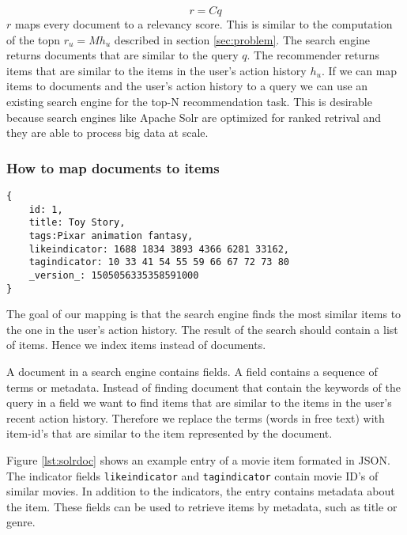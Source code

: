 \begin{equation}
  \label{eq:ser}
  r = C q
\end{equation}
$r$ maps every document to a relevancy score.
This is similar to the computation of the \gls{topn} $r_u = M h_u$  described in section \ref{sec:problem}. The search engine returns documents that are similar to the query $q$. The recommender returns items that are similar to the items in the user's action history $h_u$. If we can map items to documents and the user's action history to a query we can use an existing search engine for the top-N recommendation task. This is desirable because search engines like Apache Solr are optimized for ranked retrival and they are able to process big data at scale. 

\subsubsection{How to map documents to items}

\begin{lstlisting}[caption={Item metadata and similar items are stored in Solr.},label={lst:solrdoc}]
{
    id: 1,
    title: Toy Story,
    tags:Pixar animation fantasy,
    likeindicator: 1688 1834 3893 4366 6281 33162,
    tagindicator: 10 33 41 54 55 59 66 67 72 73 80
    _version_: 1505056335358591000
}
\end{lstlisting}

The goal of our mapping is that the search engine finds the most similar items to the one in the user's action history.
The result of the search should contain a list of items. Hence we index items instead of documents.

A document in a search engine contains fields. A field contains a sequence of terms or metadata. 
Instead of finding document that contain the keywords of the query in a field we want to find items that are similar to the items in the user's recent action history. Therefore we replace the terms (words in free text) with item-id's that are similar to the item represented by the document. 

Figure \ref{lst:solrdoc} shows an example entry of a movie item formated in JSON. The indicator fields \verb|likeindicator| and \verb|tagindicator| contain movie ID's of similar movies. In addition to the indicators, the entry contains metadata about the item. These fields can be used to retrieve items by metadata, such as title or genre.

